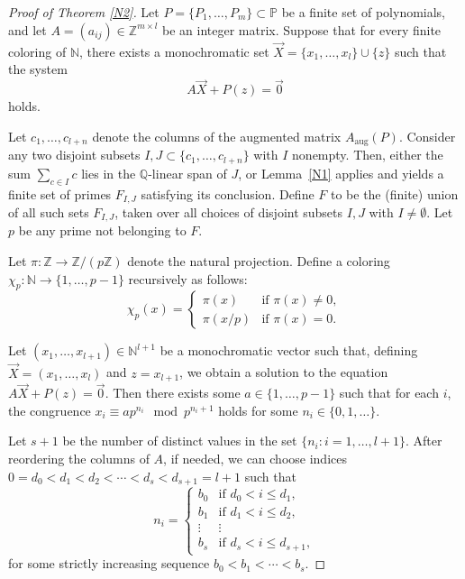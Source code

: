 \documentclass{article}
\theoremstyle{Theorem}
\theoremstyle{definition}
\begin{document}
\begin{proof}[Proof of Theorem \ref{N2}]
Let \( P = \{P_1, \ldots, P_m\} \subset \mathbb{P} \) be a finite set of polynomials, and let \( A = (a_{ij}) \in \mathbb{Z}^{m \times l} \) be an integer matrix. Suppose that for every finite coloring of \( \mathbb{N} \), there exists a monochromatic set \( \vec{X} = \{x_1, \ldots, x_l\} \cup \{z\} \) such that the system
\[
A \vec{X} + P(z) = \vec{0}
\]
holds.



Let \( c_1, \dots, c_{l+n} \) denote the columns of the augmented matrix \( A_{\mathrm{aug}}(P) \). Consider any two disjoint subsets \( I, J \subset \{c_1, \dots, c_{l+n}\} \) with \( I \) nonempty. Then, either the sum \( \sum_{c \in I} c \) lies in the \( \mathbb{Q} \)-linear span of \( J \), or Lemma~\ref{N1} applies and yields a finite set of primes \( F_{I,J} \) satisfying its conclusion. Define \( F \) to be the (finite) union of all such sets \( F_{I,J} \), taken over all choices of disjoint subsets \( I, J \) with \( I \neq \emptyset \). Let \( p \) be any prime not belonging to \( F \).



Let \( \pi : \mathbb{Z} \to \mathbb{Z}/(p\mathbb{Z}) \) denote the natural projection. Define a coloring \( \chi_p : \mathbb{N} \to \{1, \dots, p-1\} \) recursively as follows:
\[
\chi_p(x) = \begin{cases}
\pi(x) & \text{if } \pi(x) \neq 0, \\
\pi(x/p) & \text{if } \pi(x) = 0.
\end{cases}
\]



Let \( (x_1, \dots, x_{l+1}) \in \mathbb{N}^{l+1} \) be a monochromatic vector such that, defining \( \vec{X} = (x_1, \dots, x_l) \) and \( z = x_{l+1} \), we obtain a solution to the equation \( A\vec{X} + P(z) = \vec{0} \). Then there exists some \( a \in \{1, \dots, p-1\} \) such that for each \( i \), the congruence \( x_i \equiv a p^{n_i} \mod p^{n_i+1} \) holds for some \( n_i \in \{0, 1, \dots\} \).


Let \( s+1 \) be the number of distinct values in the set \( \{n_i : i = 1, \dots, l+1\} \). After reordering the columns of \( A \), if needed, we can choose indices \( 0 = d_0 < d_1 < d_2 < \cdots < d_s < d_{s+1} = l+1\) such that
\[
n_i = \begin{cases}
b_0 & \text{if } d_0 < i \leq d_1, \\
b_1 & \text{if } d_1 < i \leq d_2, \\
\vdots & \vdots \\
b_s & \text{if } d_s < i \leq d_{s+1},
\end{cases}
\]
for some strictly increasing sequence \( b_0 < b_1 < \cdots < b_s \).



\end{proof}
\end{document}
